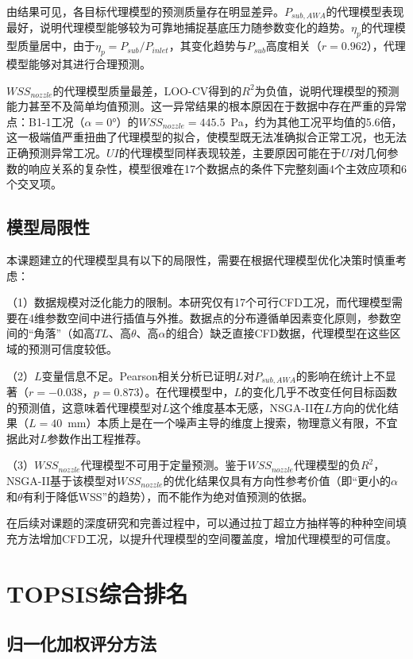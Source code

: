 由结果可见，各目标代理模型的预测质量存在明显差异。$P_{sub,AWA}$的代理模型表现最好，说明代理模型能够较为可靠地捕捉基底压力随参数变化的趋势。$\eta_p$的代理模型质量居中，由于$\eta_p = P_{sub}/P_{inlet}$，其变化趋势与$P_{sub}$高度相关（$r = 0.962$），代理模型能够对其进行合理预测。

$WSS_{nozzle}$的代理模型质量最差，LOO-CV得到的$R^2$为负值，说明代理模型的预测能力甚至不及简单均值预测。这一异常结果的根本原因在于数据中存在严重的异常点：B1-1工况（$\alpha = 0°$）的$WSS_{nozzle} = 445.5$~Pa，约为其他工况平均值的5.6倍，这一极端值严重扭曲了代理模型的拟合，使模型既无法准确拟合正常工况，也无法正确预测异常工况。$UI$的代理模型同样表现较差，主要原因可能在于$UI$对几何参数的响应关系的复杂性，模型很难在17个数据点的条件下完整刻画4个主效应项和6个交叉项。

\subsection{模型局限性}

本课题建立的代理模型具有以下的局限性，需要在根据代理模型优化决策时慎重考虑：

（1）数据规模对泛化能力的限制。本研究仅有17个可行CFD工况，而代理模型需要在4维参数空间中进行插值与外推。数据点的分布遵循单因素变化原则，参数空间的``角落''（如高$TL$、高$\theta$、高$\alpha$的组合）缺乏直接CFD数据，代理模型在这些区域的预测可信度较低。

（2）$L$变量信息不足。Pearson相关分析已证明$L$对$P_{sub,AWA}$的影响在统计上不显著（$r = -0.038$，$p = 0.873$）。在代理模型中，$L$的变化几乎不改变任何目标函数的预测值，这意味着代理模型对$L$这个维度基本无感，NSGA-II在$L$方向的优化结果（$L = 40$~mm）本质上是在一个噪声主导的维度上搜索，物理意义有限，不宜据此对$L$参数作出工程推荐。

（3）$WSS_{nozzle}$代理模型不可用于定量预测。鉴于$WSS_{nozzle}$代理模型的负$R^2$，NSGA-II基于该模型对$WSS_{nozzle}$的优化结果仅具有方向性参考价值（即``更小的$\alpha$和$\theta$有利于降低WSS''的趋势），而不能作为绝对值预测的依据。

在后续对课题的深度研究和完善过程中，可以通过拉丁超立方抽样等的种种空间填充方法增加CFD工况，以提升代理模型的空间覆盖度，增加代理模型的可信度。

\section{TOPSIS综合排名}

\subsection{归一化加权评分方法}


